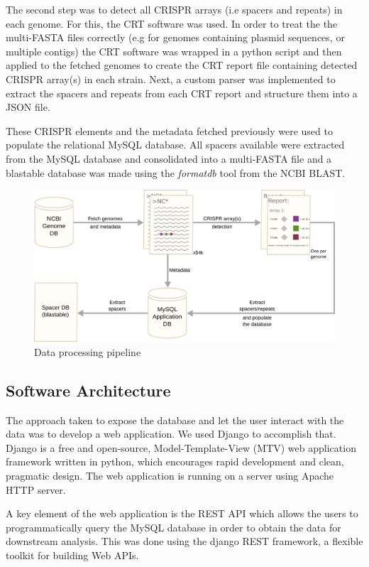 \documentclass[11pt, a4paper,titlepage]{article}
\begin{document}
The second step was to detect all CRISPR arrays (i.e spacers and
repeats) in each genome. For this, the CRT software
\cite{bland2007crispr} was used. In order to treat the the multi-FASTA
files correctly (e.g for genomes containing plasmid sequences, or
multiple contigs) the CRT software was wrapped in a python script and
then applied to the fetched genomes to create the CRT report file
containing detected CRISPR array(s) in each strain. Next, a custom
parser was implemented to extract the spacers and repeats from each
CRT report and structure them into a JSON file.

These CRISPR elements and the metadata fetched previously were used to
populate the relational MySQL database. All spacers available were
extracted from the MySQL database and consolidated into a multi-FASTA
file and a blastable database was made using the \emph{formatdb} tool
from the NCBI BLAST.

\begin{figure}
  \centering
  \includegraphics[scale=0.5]{figures/pipeline.png}
  \caption{Data processing pipeline}
\end{figure}

\subsection{Software Architecture}

The approach taken to expose the database and let the user interact
with the data was to develop a web application. We used Django to
accomplish that. Django is a free and open-source, Model-Template-View
(MTV) web application framework written in python, which encourages
rapid development and clean, pragmatic design. The web application is
running on a server using Apache HTTP server.

A key element of the web application is the REST API which allows the
users to programmatically query the MySQL database in order to obtain
the data for downstream analysis. This was done using the django REST
framework, a flexible toolkit for building Web APIs.
\end{document}
